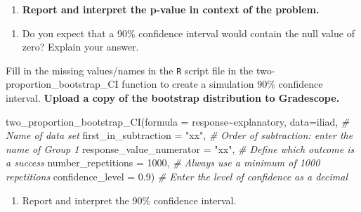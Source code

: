 \documentclass[
]{report}
\newenvironment{Shaded}{\begin{snugshade}}{\end{snugshade}}
\newcommand{\AttributeTok}[1]{\textcolor[rgb]{0.77,0.63,0.00}{#1}}
\newcommand{\CommentTok}[1]{\textcolor[rgb]{0.56,0.35,0.01}{\textit{#1}}}
\newcommand{\DecValTok}[1]{\textcolor[rgb]{0.00,0.00,0.81}{#1}}
\newcommand{\FloatTok}[1]{\textcolor[rgb]{0.00,0.00,0.81}{#1}}
\newcommand{\FunctionTok}[1]{\textcolor[rgb]{0.00,0.00,0.00}{#1}}
\newcommand{\NormalTok}[1]{#1}
\newcommand{\SpecialCharTok}[1]{\textcolor[rgb]{0.00,0.00,0.00}{#1}}
\newcommand{\StringTok}[1]{\textcolor[rgb]{0.31,0.60,0.02}{#1}}
\providecommand{\tightlist}{%
  \setlength{\itemsep}{0pt}\setlength{\parskip}{0pt}}
\begin{document}
\begin{enumerate}
\def\labelenumi{\arabic{enumi}.}
\setcounter{enumi}{9}
\tightlist
\item
  \textbf{Report and interpret the p-value in context of the problem.}
\end{enumerate}

\vspace{0.8in}

\begin{enumerate}
\def\labelenumi{\arabic{enumi}.}
\setcounter{enumi}{10}
\tightlist
\item
  Do you expect that a 90\% confidence interval would contain the null value of zero? Explain your answer.
\end{enumerate}

\vspace{0.8in}

Fill in the missing values/names in the \texttt{R} script file in the two-proportion\_bootstrap\_CI function to create a simulation 90\% confidence interval. \textbf{Upload a copy of the bootstrap distribution to Gradescope.}

\begin{Shaded}
\begin{Highlighting}[]
\FunctionTok{two\_proportion\_bootstrap\_CI}\NormalTok{(}\AttributeTok{formula =}\NormalTok{ response}\SpecialCharTok{\textasciitilde{}}\NormalTok{explanatory, }
                            \AttributeTok{data=}\NormalTok{iliad, }\CommentTok{\# Name of data set}
                            \AttributeTok{first\_in\_subtraction =} \StringTok{"xx"}\NormalTok{, }\CommentTok{\# Order of subtraction: enter the name of Group 1}
                            \AttributeTok{response\_value\_numerator =} \StringTok{"xx"}\NormalTok{, }\CommentTok{\# Define which outcome is a success }
                            \AttributeTok{number\_repetitions =} \DecValTok{1000}\NormalTok{, }\CommentTok{\# Always use a minimum of 1000 repetitions}
                            \AttributeTok{confidence\_level =} \FloatTok{0.9}\NormalTok{) }\CommentTok{\# Enter the level of confidence as a decimal}
\end{Highlighting}
\end{Shaded}

\begin{enumerate}
\def\labelenumi{\arabic{enumi}.}
\setcounter{enumi}{11}
\tightlist
\item
  Report and interpret the 90\% confidence interval.
\end{enumerate}
\end{document}
